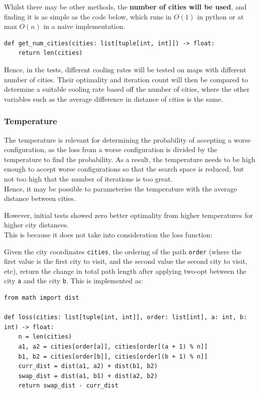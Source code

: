 \documentclass{article}
\begin{document}
Whilst there may be other methods, the \textbf{number of cities will be used}, and finding it is as simple as the code below, which runs in $O(1)$ in python or at max $O(n)$ in a naive implementation.

\begin{verbatim}
def get_num_cities(cities: list[tuple[int, int]]) -> float:
    return len(cities)
\end{verbatim}

Hence, in the tests, different cooling rates will be tested on maps with different number of cities.
Their optimality and iteration count will then be compared to determine a suitable cooling rate based off the number of cities, where the other variables such as the average difference in distance of cities is the same.

\subsubsection{Temperature}

The temperature is relevant for determining the probability of accepting a worse configuration, as the loss from a worse configuration is divided by the temperature to find the probability.
As a result, the temperature needs to be high enough to accept worse configurations so that the search space is reduced, but not too high that the number of iterations is too great.
\\

Hence, it may be possible to parameterise the temperature with the average distance between cities.

However, initial tests showed zero better optimality from higher temperatures for higher city distances.
\\

This is because it does not take into consideration the loss function: 

Given the city coordinates \texttt{cities}, the ordering of the path \texttt{order} (where the first value is the first city to visit, and the second value the second city to visit, etc), return the change in total path length after applying two-opt between the city \texttt{a} and the city \texttt{b}.
This is implemented as:

\begin{verbatim}
from math import dist

def loss(cities: list[tuple[int, int]], order: list[int], a: int, b: int) -> float:
    n = len(cities)
    a1, a2 = cities[order[a]], cities[order[(a + 1) % n]]
    b1, b2 = cities[order[b]], cities[order[(b + 1) % n]]
    curr_dist = dist(a1, a2) + dist(b1, b2)
    swap_dist = dist(a1, b1) + dist(a2, b2)
    return swap_dist - curr_dist
\end{verbatim}
\end{document}
